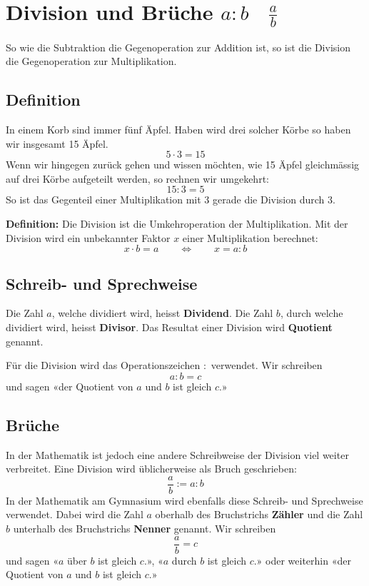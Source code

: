 \newpage
\section{Division und Brüche $a:b \quad \tfrac{a}{b}$}

So wie die Subtraktion die Gegenoperation zur Addition ist, so ist die Division die Gegenoperation zur Multiplikation.

\subsection{Definition}

In einem Korb sind immer fünf Äpfel. Haben wird drei solcher Körbe so haben wir insgesamt 15 Äpfel.
\[
  5\cdot 3 = 15
\]
Wenn wir hingegen zurück gehen und wissen möchten, wie 15 Äpfel gleichmässig auf drei
Körbe aufgeteilt werden, so rechnen wir umgekehrt:
\[
  15:3 = 5
\]
So ist das Gegenteil einer Multiplikation mit 3 gerade die Division durch 3.

\textbf{Definition:} Die Division ist die Umkehroperation der Multiplikation. Mit der Division wird ein unbekannter Faktor $x$ einer Multiplikation berechnet:
\[
  x \cdot b=a \qquad\Leftrightarrow\qquad x = a:b
\]

\subsection{Schreib- und Sprechweise}

Die Zahl $a$, welche dividiert wird, heisst \textbf{Dividend}. Die Zahl $b$, durch welche dividiert wird, heisst \textbf{Divisor}. Das Resultat einer Division wird \textbf{Quotient} genannt.

Für die Division wird das Operationszeichen $:$ verwendet. Wir schreiben
\[
  a : b = c
\]
und sagen «der Quotient von $a$ und $b$ ist gleich $c$.»

\subsection{Brüche}

In der Mathematik ist jedoch eine andere Schreibweise der Division viel weiter verbreitet. Eine Division wird üblicherweise als Bruch geschrieben:
\[
  \frac{a}{b} := a:b
\]
In der Mathematik am Gymnasium wird ebenfalls diese Schreib- und Sprechweise verwendet. Dabei wird die Zahl $a$ oberhalb des Bruchstrichs \textbf{Zähler} und die Zahl $b$ unterhalb des Bruchstrichs \textbf{Nenner} genannt. Wir schreiben
\[
  \frac{a}{b} = c
\]
und sagen «$a$ über $b$ ist gleich $c$.», «$a$ durch $b$ ist gleich $c$.» oder weiterhin «der Quotient von $a$ und $b$ ist gleich $c$.»

